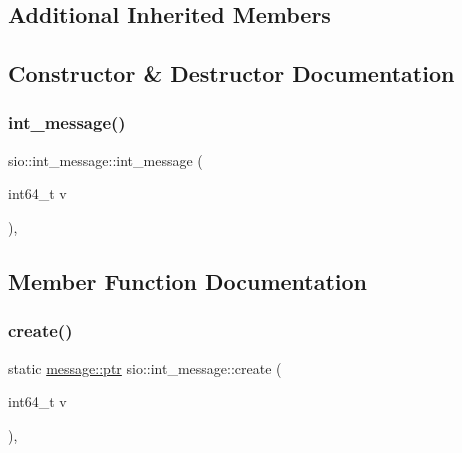 \subsection*{Additional Inherited Members}


\subsection{Constructor \& Destructor Documentation}
\mbox{\label{classsio_1_1int__message_a9d2da2260ddfdc421b5e0fb86a389a87}} 
\subsubsection{\texorpdfstring{int\+\_\+message()}{int\_message()}}
{\footnotesize\ttfamily sio\+::int\+\_\+message\+::int\+\_\+message (\begin{DoxyParamCaption}\item[{int64\+\_\+t}]{v }\end{DoxyParamCaption})\hspace{0.3cm}{\ttfamily [inline]}, {\ttfamily [protected]}}



\subsection{Member Function Documentation}
\mbox{\label{classsio_1_1int__message_afdff250333f3bd5253465ca6dbc86c61}} 
\subsubsection{\texorpdfstring{create()}{create()}}
{\footnotesize\ttfamily static \hyperlink{classsio_1_1message_a6340b6fef57e4516eb17928b1885a615}{message\+::ptr} sio\+::int\+\_\+message\+::create (\begin{DoxyParamCaption}\item[{int64\+\_\+t}]{v }\end{DoxyParamCaption})\hspace{0.3cm}{\ttfamily [inline]}, {\ttfamily [static]}}

